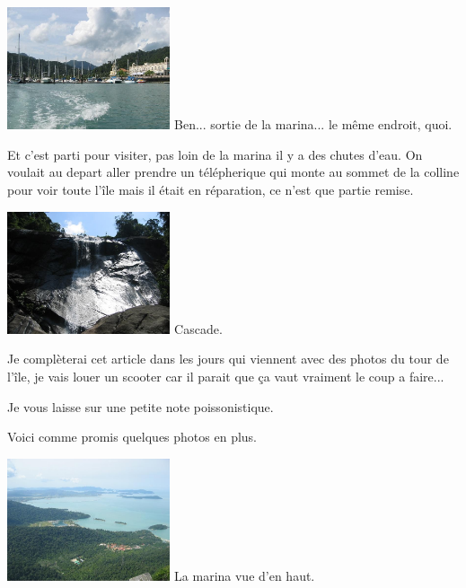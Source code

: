 \begin{multicols}{2}
\hspace*{-0.65cm}
\includegraphics[width=4.8cm]{articles/langkawi/1211018457DniB.jpg}
Ben... sortie de la marina... le même endroit, quoi.

Et c'est parti pour visiter, pas loin de la marina il y a des chutes d'eau. On voulait au depart aller prendre un télépherique qui monte au sommet de la colline pour voir toute l'île mais il était en réparation, ce n'est que partie remise.

\hspace*{-0.65cm}
\includegraphics[width=4.8cm]{articles/langkawi/1211018190Pmip.jpg}
Cascade.

Je complèterai cet article dans les jours qui viennent avec des photos du tour de l'île, je vais louer un scooter car il parait que ça vaut vraiment le coup a faire...

Je vous laisse sur une petite note poissonistique.


Voici comme promis quelques photos en plus.

\hspace*{-0.65cm}
\includegraphics[width=4.8cm]{articles/langkawi/1212397933wQ6v.jpg}
La marina vue d'en haut.


\end{multicols}

